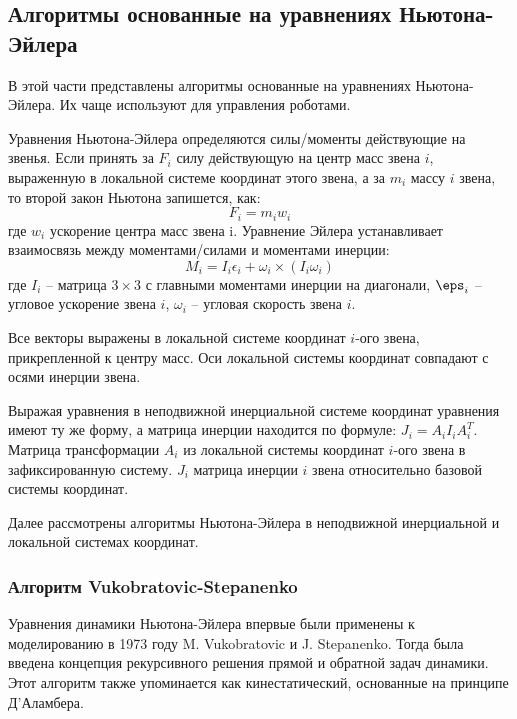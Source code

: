 \subsection{Алгоритмы основанные на уравнениях Ньютона-Эйлера}

В этой части представлены алгоритмы основанные на уравнениях Ньютона-Эйлера. Их чаще используют для управления роботами.

Уравнения Ньютона-Эйлера определяются силы/моменты действующие на звенья. Если принять за $F_i$ силу действующую на центр масс звена $i$, выраженную в локальной системе координат этого звена, а за $m_i$ массу $i$ звена, то второй закон Ньютона запишется, как:
\begin{equation}
F_i = m_i w_i
\end{equation}
где $w_i$ ускорение центра масс звена i. Уравнение Эйлера устанавливает взаимосвязь между моментами/силами и моментами инерции:
\begin{equation}
M_i = I_i \epsilon_i + \omega_i \times (I_i \omega_i)
\end{equation}
где $I_i$ -- матрица $3 \times 3$ с главными моментами инерции на диагонали,
$\eps_i$ -- угловое ускорение звена $i$, $\omega_i$ -- угловая скорость звена $i$.

Все векторы выражены в локальной системе координат $i$-ого звена, прикрепленной к центру масс. Оси локальной системы координат совпадают с осями инерции звена.

Выражая уравнения в неподвижной инерциальной системе координат уравнения имеют ту же форму, а матрица инерции находится по формуле: $J_i = A_i I_i A_i^T$. Матрица трансформации $A_i$ из локальной системы координат $i$-ого звена в зафиксированную систему. $J_i$ матрица инерции $i$ звена относительно базовой системы координат.

Далее рассмотрены алгоритмы Ньютона-Эйлера в неподвижной инерциальной и локальной системах координат.

\subsubsection{Алгоритм Vukobratovic-Stepanenko}

Уравнения динамики Ньютона-Эйлера впервые были применены к моделированию в 1973 году M. Vukobratovic и J. Stepanenko. Тогда была введена концепция рекурсивного решения прямой и обратной задач динамики. Этот алгоритм также упоминается как кинестатический, основанные на принципе Д'Аламбера. 

